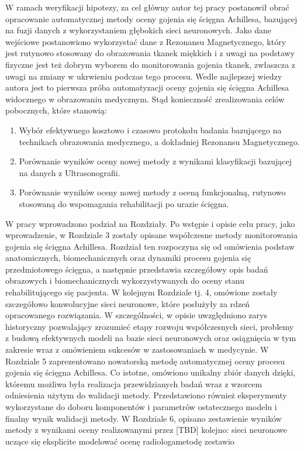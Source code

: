 W ramach weryfikacji hipotezy, za cel główny autor tej pracy postanowił obrać opracowanie automatycznej metody oceny gojenia się ścięgna Achillesa, bazującej na fuzji danych z wykorzystaniem głębokich sieci neuronowych. Jako dane wejściowe postanowiono wykorzystać dane z Rezonansu Magnetycznego, który jest rutynowo stosowany do obrazowania tkanek miękkich i z uwagi na podstawy fizyczne jest też dobrym wyborem do monitorowania gojenia tkanek, zwłaszcza z uwagi na zmiany w ukrwieniu podczas tego procesu. Wedle najlepszej wiedzy autora jest to pierwsza próba automatyzacji oceny gojenia się ścięgna Achillesa widocznego w obrazowaniu medycznym. Stąd konieczność zrealizowania celów pobocznych, które stanowią:
\begin{enumerate}
	\item Wybór efektywnego kosztowo i czasowo protokołu badania bazującego na technikach obrazowania medycznego, a dokładniej Rezonansu Magnetycznego.
	\item Porównanie wyników oceny nowej metody z wynikami klasyfikacji bazującej na danych z Ultrasonografii.
	\item Porównanie wyników oceny nowej metody z oceną funkcjonalną, rutynowo stosowaną do wspomagania rehabilitacji po urazie ścięgna.
\end{enumerate}

W pracy wprowadzono podział na Rozdziały. Po wstępie i opisie celu pracy, jako wprowadzenie, w Rozdziale 3 zostały opisane współczesne metody monitorowania gojenia się ścięgna Achillesa. Rozdział ten rozpoczyna się od omówienia podstaw anatomicznych, biomechanicznych oraz dynamiki procesu gojenia się przedmiotowego ścięgna, a następnie przedstawia szczegółowy opis badań obrazowych i biomechanicznych wykorzystywanych do oceny stanu rehabilitującego się pacjenta. W kolejnym Rozdziale tj. 4, omówione zostały szczegółowo konwolucyjne sieci neuronowe, które posłużyły za rdzeń opracowanego rozwiązania. W szczególności, w opisie uwzględniono zarys historyczny pozwalający zrozumieć etapy rozwoju współczesnych sieci, problemy z budową efektywnych modeli na bazie sieci neuronowych oraz osiągnięcia w tym zakresie wraz z omówieniem sukcesów w zastosowaniach w medycynie. W Rozdziale 5 zaprezentowano nowatorską metodę automatycznej oceny procesu gojenia się ścięgna Achillesa. Co istotne, omówiono unikalny zbiór danych dzięki, któremu możliwa była realizacja przewidzianych badań wraz z wzorcem odniesienia użytym do walidacji metody. Przedstawiono również eksperymenty wykorzystane do doboru komponentów i parametrów ostatecznego modelu i finalny wynik walidacji metody. W Rozdziale 6, opisano zestawienie wyników metody z wynikami oceny realizowanymi przez [TBD] kolejno: sieci neuronowe uczące się eksplicite modelować ocenę radiologametodę zestawio   



